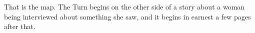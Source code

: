 \bigskip
\noindent
That is the map.
The Turn begins on the other side of a story about a woman being
interviewed about something she saw, and it begins in earnest a few
pages after that.

\renewcommand{\thefigure}{\thechapter.\arabic{figure}}\setcounter{figure}{0}
